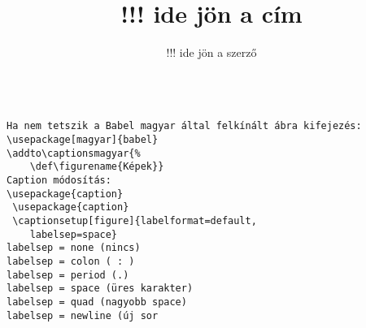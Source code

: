 \documentclass{article}
\title{!!! ide jön a cím}
\author{!!! ide jön a szerző}
\begin{document}
\begin{verbatim}

Ha nem tetszik a Babel magyar által felkínált ábra kifejezés:
\usepackage[magyar]{babel}
\addto\captionsmagyar{%
    \def\figurename{Képek}}
Caption módosítás:
\usepackage{caption}
 \usepackage{caption}
 \captionsetup[figure]{labelformat=default,
    labelsep=space}
labelsep = none (nincs)
labelsep = colon ( : )
labelsep = period (.)
labelsep = space (üres karakter)
labelsep = quad (nagyobb space)
labelsep = newline (új sor

\end{verbatim}
\end{document}
